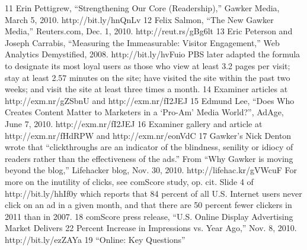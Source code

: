 11 Erin Pettigrew, ``Strengthening Our Core (Readership),'' Gawker Media, March 5, 2010.
http://bit.ly/hnQnLv
12 Felix Salmon, ``The New Gawker Media,'' Reuters.com, Dec. 1, 2010. http://reut.rs/gBg6lt
13 Eric Peterson and Joseph Carrabis, ``Measuring the Immeasurable: Visitor Engagement,''
Web Analytics Demystified, 2008. http://bit.ly/hvFuio PBS later adapted the formula to
designate its most loyal users as those who view at least 3.2 pages per visit; stay at least 2.57
minutes on the site; have visited the site within the past two weeks; and visit the site at least
three times a month.
14 Examiner articles at http://exm.nr/gZSbnU and http://exm.nr/fI2JEJ
15 Edmund Lee, ``Does Who Creates Content Matter to Marketers in a ‘Pro-Am’ Media World?'',
AdAge, June 7, 2010. http://exm.nr/fI2JEJ
16 Examiner gallery and article at http://exm.nr/fHdRPW and http://exm.nr/eonVdC
17 Gawker’s Nick Denton wrote that ``clickthroughs are an indicator of the blindness, senility
or idiocy of readers rather than the effectiveness of the ads.'' From ``Why Gawker is moving
beyond the blog,'' Lifehacker blog, Nov. 30, 2010. http://lifehac.kr/gVWcuF For more on the
inutility of clicks, see comScore study, op. cit. Slide 4 of http://bit.ly/hhIf0y which reports that
84 percent of all U.S. Internet users never click on an ad in a given month, and that there are
50 percent fewer clickers in 2011 than in 2007.
18 comScore press release, ``U.S. Online Display Advertising Market Delivers 22 Percent Increase
in Impressions vs. Year Ago,'' Nov. 8, 2010. http://bit.ly/ezZAYa
19 ``Online: Key Questions''


